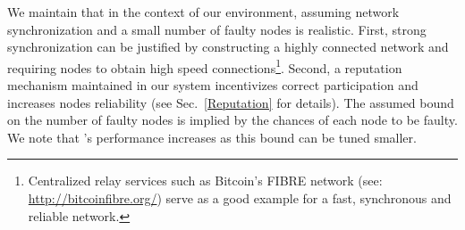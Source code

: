 We maintain that in the context of our environment, assuming network synchronization and a small number of faulty nodes is realistic.
First, strong synchronization can be justified by constructing a highly connected network and requiring nodes to obtain high speed connections\footnote{Centralized relay services such as Bitcoin's FIBRE network (see: \url{http://bitcoinfibre.org/}) serve as a good example for a fast, synchronous and reliable network.}. 
Second, a reputation mechanism maintained in our system incentivizes correct participation and increases nodes reliability (see Sec.~\ref{Reputation} for details). The assumed bound on the number of faulty nodes is implied by the chances of each node to be faulty. We note that \nameNS's performance increases as this bound can be tuned smaller.

